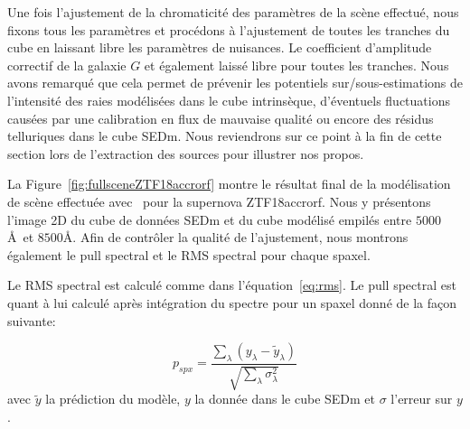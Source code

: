 \documentclass[../main/main.tex]{subfiles}
\begin{document}
Une fois l'ajustement de la chromaticité des paramètres de la scène
effectué, nous fixons tous les paramètres et procédons à l'ajustement
de toutes les tranches du cube en laissant libre les paramètres de
nuisances. Le coefficient d'amplitude correctif de la galaxie $G$ et
également laissé libre pour toutes les tranches. Nous avons remarqué que cela
permet de prévenir les
potentiels sur/sous-estimations de l'intensité des raies modélisées dans
le cube intrinsèque, d'éventuels fluctuations causées par une
calibration en flux de mauvaise qualité ou encore des résidus
telluriques dans le cube SEDm. Nous reviendrons sur ce point à la fin de
cette section lors de l'extraction des sources pour illustrer nos propos.

La Figure~\ref{fig:fullsceneZTF18accrorf} montre le résultat final de la
modélisation de scène effectuée avec \hypergal\ pour la supernova
ZTF18accrorf. Nous y présentons l'image 2D du cube de données SEDm et du cube
modélisé empilés entre $5000$\AA\ et $8500$\AA. Afin de contrôler la
qualité de l'ajustement, nous montrons également le pull spectral et le
RMS spectral pour chaque spaxel.

Le RMS spectral est calculé comme dans l'équation~\ref{eq:rms}. Le
pull spectral est quant à lui calculé après intégration du spectre pour
un spaxel donné de la façon suivante:

\begin{equation}
  \label{eq:pullspectral}
  p_{spx}=\frac{\sum\limits_{\lambda}\left( y_{\lambda}-\widetilde{y}_{\lambda}\right)}{\sqrt{\sum\limits_{\lambda}\sigma_{\lambda}^{2}}}
\end{equation}
avec $\widetilde{y}$ la prédiction du modèle, $y$ la donnée dans le cube
SEDm et $\sigma$ l'erreur sur $y$.
\end{document}
